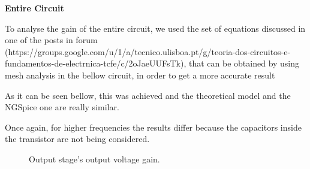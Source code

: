   
 
 \vspace{1cm}
 
 \textbf{Entire Circuit} 
 
 \indent

To analyse the gain of the entire circuit, we used the set of equations discussed in one of the posts in forum (https://groups.google.com/u/1/a/tecnico.ulisboa.pt/g/teoria-dos-circuitos-e-fundamentos-de-electrnica-tcfe/c/2oJaeUUFsTk), that can be obtained by using mesh analysis in the bellow circuit, in order to get a more accurate result



As it can be seen bellow, this was achieved and the theoretical model and the NGSpice one are really similar.

Once again, for higher frequencies the results differ because the capacitors inside the transistor are not being considered.
 

 
 
 
 
 
 
 
 
 
 
 \begin{figure}[h]
    \centering
{}
  \hfill
{}
\caption{Output stage's output voltage gain.}
\end{figure}

  
 
 
 

